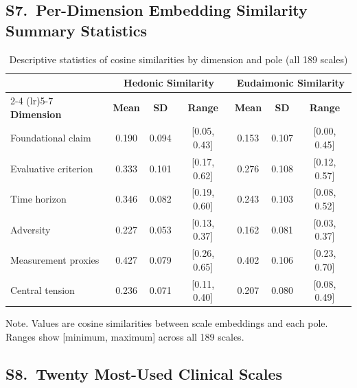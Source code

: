 \documentclass[12pt,a4paper]{article}
\newcommand{\floatnote}[1]{\par\vspace{4pt}\begin{minipage}{\linewidth}\small\textnormal{Note. #1}\end{minipage}}
\begin{document}
\clearpage
\subsection*{S7.\ Per-Dimension Embedding Similarity Summary Statistics}

\begin{table}[H]
\caption{Descriptive statistics of cosine similarities by dimension and pole (all 189 scales)}
\label{tab:s_dim_descriptives}
\small
\begin{tabular}{lcccccc}
\toprule
 & \multicolumn{3}{c}{\textbf{Hedonic Similarity}} & \multicolumn{3}{c}{\textbf{Eudaimonic Similarity}} \\
\cmidrule(lr){2-4} \cmidrule(lr){5-7}
\textbf{Dimension} & \textbf{Mean} & \textbf{SD} & \textbf{Range} & \textbf{Mean} & \textbf{SD} & \textbf{Range} \\
\midrule
Foundational claim        & 0.190 & 0.094 & [0.05, 0.43] & 0.153 & 0.107 & [0.00, 0.45] \\
Evaluative criterion      & 0.333 & 0.101 & [0.17, 0.62] & 0.276 & 0.108 & [0.12, 0.57] \\
Time horizon              & 0.346 & 0.082 & [0.19, 0.60] & 0.243 & 0.103 & [0.08, 0.52] \\
Adversity                 & 0.227 & 0.053 & [0.13, 0.37] & 0.162 & 0.081 & [0.03, 0.37] \\
Measurement proxies       & 0.427 & 0.079 & [0.26, 0.65] & 0.402 & 0.106 & [0.23, 0.70] \\
Central tension           & 0.236 & 0.071 & [0.11, 0.40] & 0.207 & 0.080 & [0.08, 0.49] \\
\bottomrule
\end{tabular}
\floatnote{Values are cosine similarities between scale embeddings and each pole. Ranges show [minimum, maximum] across all 189 scales.}
\end{table}

\clearpage
\subsection*{S8.\ Twenty Most-Used Clinical Scales}
\end{document}
